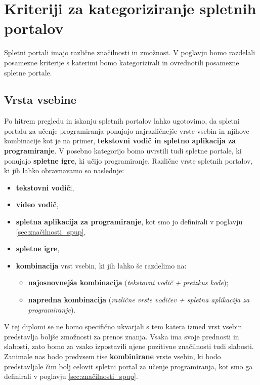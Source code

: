 \section{Kriteriji za kategoriziranje spletnih portalov}
\label{sec:kriteriji_za_kategoriziranje_spletnih_portalov}

Spletni portali imajo različne značilnosti in zmožnost. V poglavju
bomo razdelali posamezne kriterije s katerimi bomo kategorizirali in
ovrednotili posamezne spletne portale.

\subsection{Vrsta vsebine}
\label{sec:Razvrstitev_spletnih_portalov}

Po hitrem pregledu in iskanju spletnih portalov lahko ugotovimo, da
spletni portalu za učenje programiranja ponujajo najrazličnejše vrste
vsebin in njihove kombinacije kot je na primer, \textbf{tekstovni
  vodič in spletno aplikacija za programiranje}. V posebno kategorijo
bomo uvrstili tudi spletne portale, ki ponujajo \textbf{spletne igre},
ki učijo programiranje. Različne vrste spletnih portalov, ki jih lahko
obravnavamo so naslednje:

\begin{itemize}
\tightlist
\item \textbf{tekstovni vodič}i,
\item \textbf{video vodič},

\item \textbf{spletna aplikacija za programiranje}, kot smo jo
  definirali v poglavju \ref{sec:značilnosti_spup},
\item \textbf{spletne igre},
\item \textbf{kombinacija} vrst vsebin, ki jih lahko še razdelimo na:
  \begin{itemize}
    \tightlist
  \item \textbf{najosnovnejša kombinacija} (\emph{tekstovni vodič + preizkus kode});
  \item \textbf{napredna kombinacija} (\emph{različne vrste vodičev +
      spletna aplikacija za programiranje}).
  \end{itemize}
\end{itemize}

V tej diplomi se ne bomo specifično ukvarjali s tem katera izmed vrst
vsebin predstavlja boljše zmožnosti za prenos znanja. Vsaka ima svoje
prednosti in slabosti, zato bomo za vsako izpostavili njene pozitivne
značilnosti tudi slabosti. Zanimale nas bodo predvsem tise
\textbf{kombinirane} vrste vsebin, ki bodo predstavljale čim bolj
celovit spletni portal za učenje programiranja, kot smo ga definirali
v poglavju \ref{sec:značilnosti_spup}.


